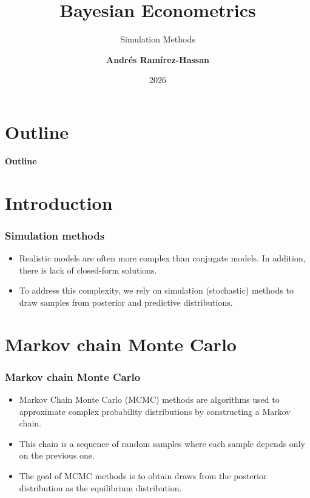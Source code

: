 \documentclass[12pt, compress]{beamer}
\title{Bayesian Econometrics}
\subtitle{Simulation Methods}
\date{2026}
\author[Andr\'e Ram\'irez H.]{\textbf{Andr\'es Ram\'irez-Hassan}}
\institute[EAFIT]{\small{Universidad EAFIT\\School of Finance, Economics and Government}}
\begin{document}
	
	\maketitle
	
	
	
	
	\section*{Outline}
	\begin{frame}
		\textbf{\Large{Outline}}
		\tableofcontents
	\end{frame}
	
\section{Introduction}
	
\begin{frame}
	\frametitle{Simulation methods}
	\begin{itemize}
		\item Realistic models are often more complex than conjugate models. In addition, there is lack of closed-form solutions.
		\item To address this complexity, we rely on simulation (stochastic) methods to draw samples from posterior and predictive distributions.
	\end{itemize}
\end{frame}

\section{Markov chain Monte Carlo}
\begin{frame}
\frametitle{Markov chain Monte Carlo}
	\begin{itemize}
		\item Markov Chain Monte Carlo (MCMC) methods are algorithms used to approximate complex probability distributions by constructing a Markov chain. 
		\item This chain is a sequence of random samples where each sample depends only on the previous one. 
		\item The goal of MCMC methods is to obtain draws from the posterior distribution as the equilibrium distribution.
	\end{itemize}
\end{frame}
\end{document}

